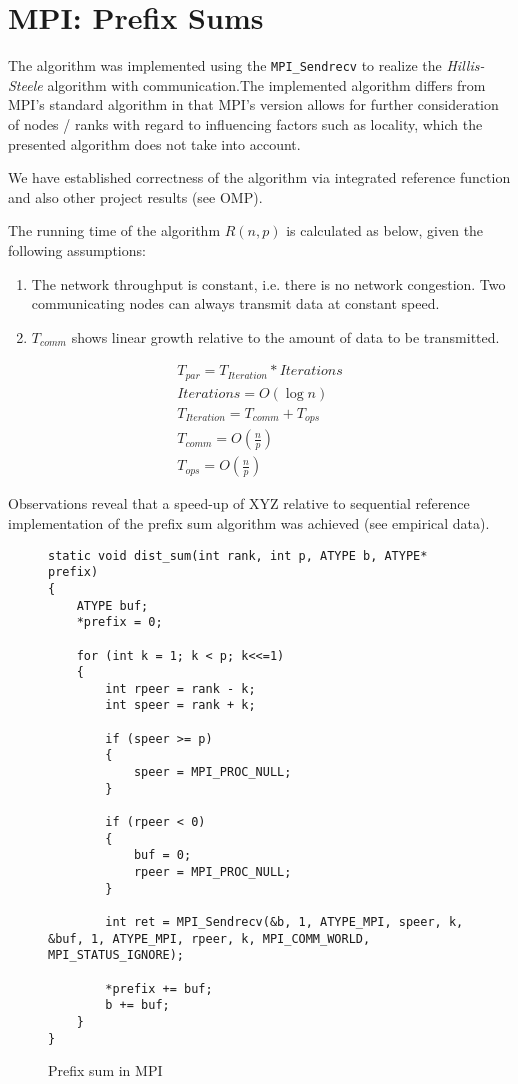 \documentclass[11pt]{article}
\begin{document}
\section{MPI: Prefix Sums}
The algorithm was implemented using the \verb=MPI_Sendrecv= to realize the \emph{Hillis-Steele} algorithm with communication.The implemented algorithm differs from MPI's standard algorithm in that MPI's version allows for further consideration of nodes / ranks with regard to influencing factors such as locality, which the presented algorithm does not take into account.

We have established correctness of the algorithm via integrated reference function and also other project results (see OMP).

The running time of the algorithm $R(n, p)$ is calculated as below, given the following assumptions:
\begin{enumerate}
\item The network throughput is constant, i.e. there is no network congestion. Two communicating nodes can always transmit data at constant speed.
\item $T_{comm}$ shows linear growth relative to the amount of data to be transmitted.
\end{enumerate}

\begin{eqnarray}
T_{par} = T_{Iteration} * Iterations\\
Iterations = O(\log n)\\
T_{Iteration} = T_{comm} + T_{ops}\\
T_{comm} = O\left(\frac{n}{p}\right)\\
T_{ops} = O\left(\frac{n}{p}\right)
\end{eqnarray}

Observations reveal that a speed-up of XYZ relative to sequential reference implementation of the prefix sum algorithm was achieved (see empirical data).

\begin{figure}
\label{mpi_prefix_code}
\caption{Prefix sum in MPI}
\begin{lstlisting}
static void dist_sum(int rank, int p, ATYPE b, ATYPE* prefix)
{
	ATYPE buf;
	*prefix = 0;

	for (int k = 1; k < p; k<<=1) 
	{
		int rpeer = rank - k;
		int speer = rank + k;

		if (speer >= p)
		{
			speer = MPI_PROC_NULL;	
		}

		if (rpeer < 0)
		{
			buf = 0;
			rpeer = MPI_PROC_NULL;
		}

		int ret = MPI_Sendrecv(&b, 1, ATYPE_MPI, speer, k, &buf, 1, ATYPE_MPI, rpeer, k, MPI_COMM_WORLD, MPI_STATUS_IGNORE);
		
		*prefix += buf;
		b += buf;
	}
}
\end{lstlisting}

\end{figure}
\end{document}

